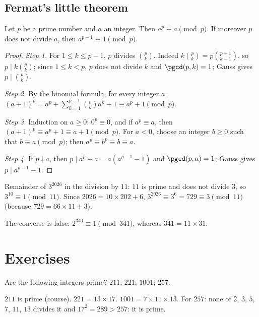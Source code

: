 \subsection{Fermat's little theorem}
\begin{theorem}
Let $p$ be a prime number and $a$ an integer. Then $a^p\equiv a\pmod p$. If moreover $p$ does not divide $a$, then $a^{p-1}\equiv1\pmod p$.
\end{theorem}
\begin{proof}
\emph{Step 1.} For $1\le k\le p-1$, $p$ divides $\binom pk$. Indeed $k\binom pk=p\binom{p-1}{k-1}$, so $p\mid k\binom pk$; since $1\le k<p$, $p$ does not divide $k$ and $\pgcd(p,k)=1$; Gauss gives $p\mid\binom pk$.\par
\emph{Step 2.} By the binomial formula, for every integer $a$, $(a+1)^p=a^p+\sum_{k=1}^{p-1}\binom pk a^k+1\equiv a^p+1\pmod p$.\par
\emph{Step 3.} Induction on $a\ge0$: $0^p\equiv0$, and if $a^p\equiv a$, then $(a+1)^p\equiv a^p+1\equiv a+1\pmod p$. For $a<0$, choose an integer $b\ge0$ such that $b\equiv a\pmod p$; then $a^p\equiv b^p\equiv b\equiv a$.\par
\emph{Step 4.} If $p\nmid a$, then $p\mid a^p-a=a\left(a^{p-1}-1\right)$ and $\pgcd(p,a)=1$; Gauss gives $p\mid a^{p-1}-1$.
\end{proof}
\begin{example}[A remainder]
Remainder of $3^{2026}$ in the division by $11$: $11$ is prime and does not divide $3$, so $3^{10}\equiv1\pmod{11}$. Since $\num{2026}=10\times202+6$, $3^{2026}\equiv3^6=729\equiv3\pmod{11}$ (because $729=66\times11+3$).
\end{example}
\begin{pitfall}
The converse is false: $2^{340}\equiv1\pmod{341}$, whereas $341=11\times31$.
\end{pitfall}

\mxnewpage
\section{Exercises}
\begin{exercise}
Are the following integers prime? $211$; $221$; $\num{1001}$; $257$.
\end{exercise}
\begin{solution}
$211$ is prime (course). $221=13\times17$. $\num{1001}=7\times11\times13$. For $257$: none of $2$, $3$, $5$, $7$, $11$, $13$ divides it and $17^2=289>257$: it is prime.
\end{solution}

